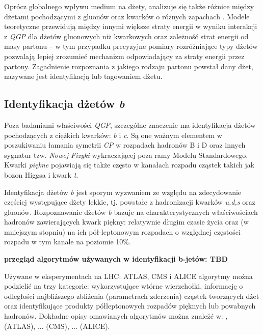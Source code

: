 Oprócz globalnego wpływu medium na dżety, analizuje się także różnice między dżetami pochodzącymi z gluonów oraz kwarków o różnych zapachach . Modele teoretyczne przewidują między innymi większe straty energii w wyniku interakcji z \textit{QGP} dla dżetów gluonowych niż kwarkowych \cite{Salgado:2003gb} oraz zależność strat energii od masy partonu \cite{Dokshitzer:2001zm} -- w tym przypadku precyzyjne pomiary rozróżniające typy dżetów pozwalają lepiej zrozumieć mechanizm odpowiadający za straty energii przez partony. Zagadnienie rozpoznania z jakiego rodzaju partonu powstał dany dżet, nazywane jest identyfikacją lub tagowaniem dżetu.


\subsection{Identyfikacja dżetów \textit{b}}
\label{subsec:b-dzety}

Poza badaniami właściwości \textit{QGP}, szczególne znaczenie ma identyfikacja dżetów pochodzących z ciężkich kwarków: \textit{b} i \textit{c}.
Są one ważnym elementem w poszukiwaniu łamania symetrii \textit{CP} w rozpadach hadronów B i D oraz innych sygnatur tzw. \textit{Nowej Fizyki} wykraczającej poza ramy Modelu Standardowego. 
Kwarki \textit{piękne} pojawiają się także często w kanałach rozpadu cząstek takich jak bozon Higgsa i kwark \textit{t}.

Identyfikacja dżetów \textit{b} jest sporym wyzwaniem ze względu na zdecydowanie częściej występujące dżety lekkie, tj. powstałe z hadronizacji kwarków \textit{u,d,s} oraz gluonów.
Rozpoznawanie dżetów \textit{b} bazuje na charakterystycznych właściwościach hadronów zawierających kwark piękny: relatywnie długim czasie życia oraz (w mniejszym stopniu) na ich pół-leptonowym rozpadach o względnej częstości rozpadu w tym kanale  na poziomie 10\%.

\textbf{przegląd algorytmów używanych w identyfikacji b-jetów: TBD} 

Używane w eksperymentach na LHC: ATLAS, CMS i ALICE algorytmy można podzielić na trzy kategorie: wykorzystujące wtórne wierzchołki,  informację o odległości najbliższego zbliżenia (parametrach zderzenia)  cząstek tworzących dżet oraz identyfikujące produkty półleptonowych rozpadów pięknych lub powabnych hadronów. Dokładne opisy omawianych algorytmów można znaleźć w: \cite{Aad:2015ydr}, \cite{Sirunyan:2017ezt} (ATLAS), ... (CMS), ... (ALICE).

